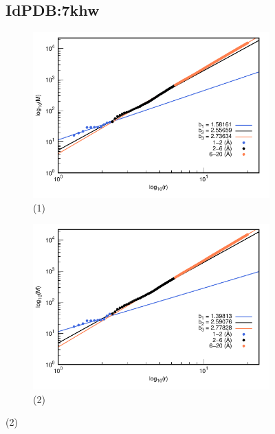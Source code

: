 \begin{figure}[H]
	\subsection*{IdPDB:7khw}
	
	\hspace{-0.3cm} 
	\begin{subfigure}{0.49\textwidth}
		\centering
		\includegraphics[width=\linewidth,page=1]{graphs/PDBs/7khw/7khwaddH.pdf}
		\caption{(1)}
	\end{subfigure}
	\hspace{0.2cm}
	\begin{subfigure}{0.49\textwidth}
		\centering
		\includegraphics[width=\linewidth,page=1]{graphs/PDBs/7khw/7khwEm.pdf}
		\caption{(2)}
	\end{subfigure}
	

\end{figure}
